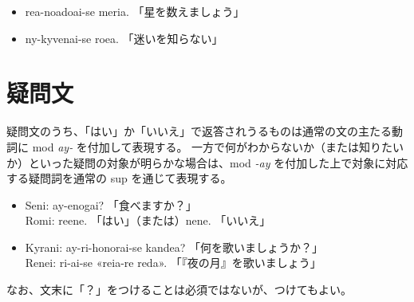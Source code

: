 \begin{itemize}
    \item rea-noadoai-se meria. 「星を数えましょう」
    \item ny-kyvenai-se roea. 「迷いを知らない」
\end{itemize}

\section{疑問文}

疑問文のうち、「はい」か「いいえ」で返答されうるものは通常の文の主たる動詞に mod \emph{ay-} を付加して表現する。
一方で何がわからないか（または知りたいか）といった疑問の対象が明らかな場合は、mod \emph{-ay} を付加した上で対象に対応する疑問詞を通常の sup を通じて表現する。

\begin{itemize}
    \item Seni: ay-enogai? 「食べますか？」 \\ Romi: reene. 「はい」（または）nene. 「いいえ」
    \item Kyrani: ay-ri-honorai-se kandea? 「何を歌いましょうか？」\\ Renei: ri-ai-se «reia-re reda». 「『夜の月』を歌いましょう」
\end{itemize}

なお、文末に「？」をつけることは必須ではないが、つけてもよい。